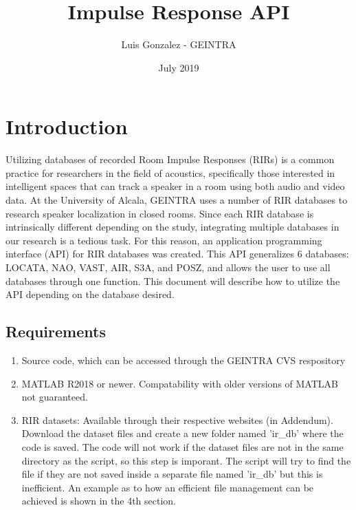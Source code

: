 \documentclass{article}
\title{Impulse Response API}
\author{Luis Gonzalez - GEINTRA}
\date{July 2019}
\begin{document}
\maketitle

\section{Introduction}
Utilizing databases of recorded Room Impulse Responses (RIRs) is a common practice for researchers in the field of acoustics, specifically those interested in intelligent spaces that can track a speaker in a room using both audio and video data. At the University of Alcala, GEINTRA uses a number of RIR databases to research speaker localization in closed rooms. Since each RIR database is intrinsically different depending on the study, integrating multiple databases in our research is a tedious task. For this reason, an application programming interface (API) for RIR databases was created. This API generalizes 6 databases: LOCATA, NAO, VAST, AIR, S3A, and POSZ, and allows the user to use all databases through one function. This document will describe how to utilize the API depending on the database desired.
\subsection{Requirements}
\begin{enumerate}
    \item Source code, which can be accessed through the GEINTRA CVS respository
    \item MATLAB R2018 or newer. Compatability with older versions of MATLAB not guaranteed.
    \item RIR datasets: Available through their respective websites (in Addendum). Download the dataset files and create a new folder named 'ir\_db' where the code is saved. The code will not work if the dataset files are not in the same directory as the script, so this step is imporant. The script will try to find the file if they are not saved inside a separate file named 'ir\_db' but this is inefficient. An example as to how an efficient file management can be achieved is shown in the 4th section.
\end{enumerate}
\end{document}

